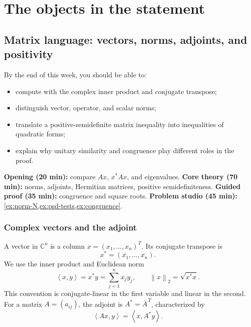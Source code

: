 \documentclass[11pt,oneside,openany]{book}
\theoremstyle{definition}
\theoremstyle{remark}
\newcommand{\C}{\mathbb C}
\newcommand{\ip}[2]{\left\langle #1,#2\right\rangle}
\newcommand{\norm}[1]{\left\lVert #1\right\rVert}
\begin{document}
\mainmatter

\part{The objects in the statement}

\chapter{Matrix language: vectors, norms, adjoints, and positivity}
\label{ch:matrix-language}

\begin{learninggoals}
By the end of this week, you should be able to:
\begin{itemize}
  \item compute with the complex inner product and conjugate transpose;
  \item distinguish vector, operator, and scalar norms;
  \item translate a positive-semidefinite matrix inequality into
  inequalities of quadratic forms;
  \item explain why unitary similarity and congruence play different
  roles in the proof.
\end{itemize}
\end{learninggoals}

\begin{workshopplan}
\textbf{Opening (20 min):} compare \(Ax\), \(x^*Ax\), and eigenvalues.
\textbf{Core theory (70 min):} norms, adjoints, Hermitian matrices,
positive semidefiniteness.
\textbf{Guided proof (35 min):} congruence and square roots.
\textbf{Problem studio (45 min):} \cref{ex:norm-N,ex:psd-tests,ex:congruence}.
\end{workshopplan}

\section{Complex vectors and the adjoint}

A vector in \(\C^n\) is a column \(x=(x_1,\ldots,x_n)^T\).
Its conjugate transpose is
\[
  x^*=(\overline{x_1},\ldots,\overline{x_n}).
\]
We use the inner product and Euclidean norm
\[
  \ip{x}{y}=x^*y=\sum_{j=1}^n\overline{x_j}y_j,
  \qquad
  \norm{x}_2=\sqrt{x^*x}.
\]
This convention is conjugate-linear in the first variable and linear
in the second.  For a matrix \(A=(a_{ij})\), the adjoint is
\(A^*=\overline A^{\,T}\), characterized by
\[
  \ip{Ax}{y}=\ip{x}{A^*y}.
\]
\end{document}
